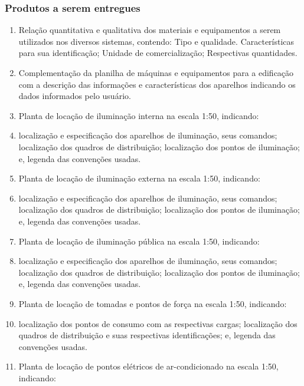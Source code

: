 \subsubsection{Produtos a serem entregues}
	\begin{enumerate}
		
			\item Relação quantitativa e qualitativa dos materiais e equipamentos a serem utilizados nos diversos sistemas, contendo: Tipo e qualidade. Características para sua identificação; Unidade de comercialização; Respectivas quantidades. 


			\item Complementação da planilha de máquinas e equipamentos para a edificação com a descrição das informações e características dos aparelhos indicando os dados informados pelo usuário. 

	\item Planta de locação de iluminação interna na escala 1:50,  indicando: 

\item localização e especificação dos aparelhos de iluminação, seus comandos; localização dos quadros de distribuição; localização dos pontos de iluminação; e, legenda das convenções usadas.

\item Planta de locação de iluminação externa na escala 1:50,  indicando: 

\item localização e especificação dos aparelhos de iluminação, seus comandos; localização dos quadros de distribuição; localização dos pontos de iluminação; e, legenda das convenções usadas.

\item Planta de locação de iluminação pública na escala 1:50,  indicando: 

\item localização e especificação dos aparelhos de iluminação, seus comandos; localização dos quadros de distribuição; localização dos pontos de iluminação; e, legenda das convenções usadas.

\item Planta de locação de tomadas e pontos de força na escala 1:50, indicando: 

\item localização dos pontos de consumo com as respectivas cargas; localização dos quadros de distribuição e suas respectivas identificações; e, legenda das convenções usadas.

\item Planta de locação de pontos elétricos de ar-condicionado na escala 1:50, indicando: 


\end{enumerate}
